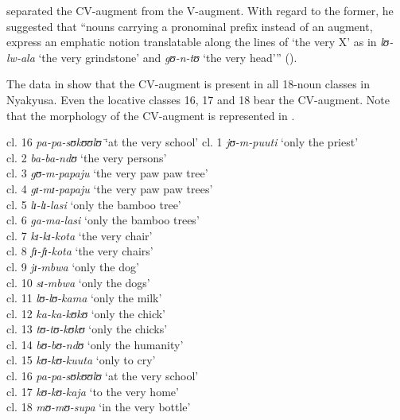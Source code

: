 \documentclass[output=paper]{langscibook}
\begin{document}
\citet[44]{Persohn2017} separated the CV-aug\-ment from the V-aug\-ment. With regard to the former, he suggested that “nouns carrying a pronominal prefix instead of an augment, express an emphatic notion translatable along the lines of ‘the very X’ as in \textit{lʊ{}-lw-ala} ‘the very grindstone’ and \textit{gʊ{}-n-tʊ} ‘the very head’” (\citeyear[44]{Persohn2017}). 

The data in  show that the CV-aug\-ment is present in all 18-noun classes in Nyakyusa. Even the locative classes 16, 17 and 18 bear the CV-aug\-ment. Note that the morphology of the CV-aug\-ment is represented in .    

\ea%
    \label{ex:lusekelo:21}
    \begin{tabbing}
    cl. 16 \= \textit{pa{}-pa-sʊkʊʊlʊ} \= ‘at the very school’ \kill
  cl. 1 \> \textit{jʊ{}-m-puuti} \> ‘only the priest’\\
  cl. 2 \> \textit{ba-ba-ndʊ} \> ‘the very persons’         \\
  cl. 3 \> \textit{gʊ-m-papaju} \> ‘the very paw paw tree’  \\
  cl. 4 \> \textit{gɪ{}-mɪ-papaju} \> ‘the very paw paw trees’ \\
  cl. 5 \> \textit{lɪ{}-lɪ-lasi} \> ‘only the bamboo tree’ \\
  cl. 6 \> \textit{ga{}-ma-lasi} \> ‘only the bamboo trees’\\
  cl. 7 \> \textit{kɪ{}-kɪ{}-kota} \> ‘the very chair’ \\
  cl. 8 \> \textit{fɪ{}-fɪ{}-kota} \> ‘the very chairs’ \\
  cl. 9 \> \textit{jɪ{}-mbwa} \> ‘only the dog’ \\
  cl. 10 \> \textit{sɪ{}-mbwa} \> ‘only the dogs’ \\
  cl. 11 \> \textit{lʊ-lʊ-kama} \> ‘only the milk’\\
  cl. 12 \> \textit{ka{}-ka-kʊkʊ} \> ‘only the chick’ \\
  cl. 13 \> \textit{tʊ-tʊ-kʊkʊ} \> ‘only the chicks’\\
  cl. 14 \> \textit{bʊ-bʊ-ndʊ} \> ‘only the humanity’\\
  cl. 15 \> \textit{kʊ-kʊ-kuuta} \> ‘only to cry’ \\
  cl. 16 \> \textit{pa{}-pa-sʊkʊʊlʊ} \> ‘at the very school’ \\
  cl. 17 \> \textit{kʊ-kʊ-kaja} \> ‘to the very home’\\
  cl. 18 \> \textit{mʊ-mʊ-supa} \> ‘in the very bottle’
\end{tabbing}
\z
\end{document}
